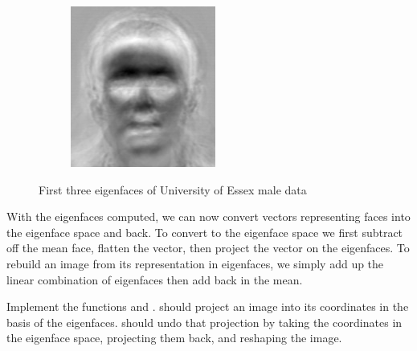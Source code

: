 \begin{figure}
\begin{subfigure}[b]{0.3\textwidth}
\end{subfigure}
\begin{subfigure}[b]{0.3\textwidth}
\includegraphics[width=\textwidth]{eigenface2.png}
\end{subfigure}
\caption{First three eigenfaces of University of Essex male data}
\label{facialRecognition:eigenfaces}
\end{figure}

With the eigenfaces computed, we can now convert vectors representing faces into the eigenface space and back.
To convert to the eigenface space we first subtract off the mean face, flatten the vector, then project the vector on the eigenfaces.
To rebuild an image from its representation in eigenfaces, we simply add up the linear combination of eigenfaces then add back in the mean.

\begin{problem}
Implement the functions  and .
 should project an image into its coordinates in the basis of the eigenfaces.
 should undo that projection by taking the coordinates in the eigenface space, projecting them back, and reshaping the image.
\end{problem}

